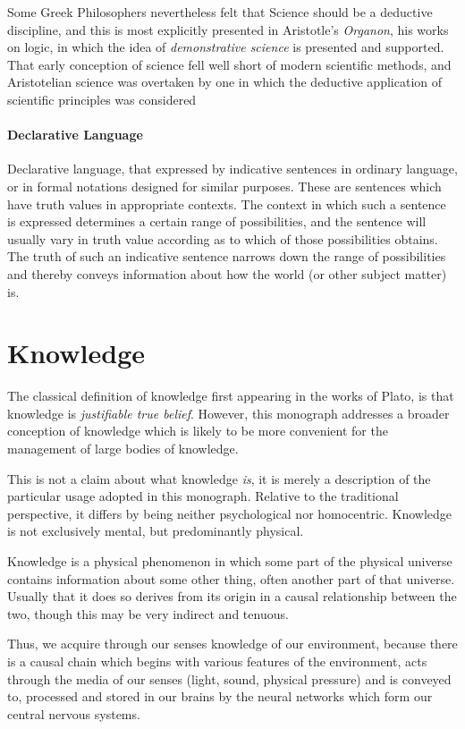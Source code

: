 Some Greek Philosophers nevertheless felt that Science should be a deductive discipline, and this is most explicitly presented in Aristotle's \emph{Organon}, his works on logic, in which the idea of \emph{demonstrative science} is presented and supported.
That early conception of science fell well short of modern scientific methods, and Aristotelian science was overtaken by one in which the deductive application of scientific principles was considered 

\paragraph{Declarative Language}

Declarative language, that expressed by indicative sentences in ordinary language, or in formal notations designed for similar purposes.
These are sentences which have truth values in appropriate contexts.
The context in which such a sentence is expressed determines a certain range of possibilities, and the sentence will usually vary in truth value according as to which of those possibilities obtains.
The truth of such an indicative sentence narrows down the range of possibilities and thereby conveys information about how the world (or other subject matter) is.

\section{Knowledge}

The classical definition of knowledge first appearing in the works of Plato, is that knowledge is \emph{justifiable true belief}.
However, this monograph addresses a broader conception of knowledge which is likely to be more convenient for the management of large bodies of knowledge.

This is not a claim about what knowledge \emph{is}, it is merely a description of the particular usage adopted in this monograph.
Relative to the traditional perspective, it differs by being neither psychological nor homocentric.
Knowledge is not exclusively mental, but predominantly physical.

Knowledge is a physical phenomenon in which some part of the physical universe contains information about some other thing, often another part of that universe.
Usually that it does so derives from its origin in a causal relationship between the two, though this may be very indirect and tenuous.

Thus, we acquire through our senses knowledge of our environment, because there is a causal chain which begins with various features of the environment, acts through the media of our senses (light, sound, physical pressure) and is conveyed to, processed and stored in our brains by the neural networks which form our central nervous systems.

